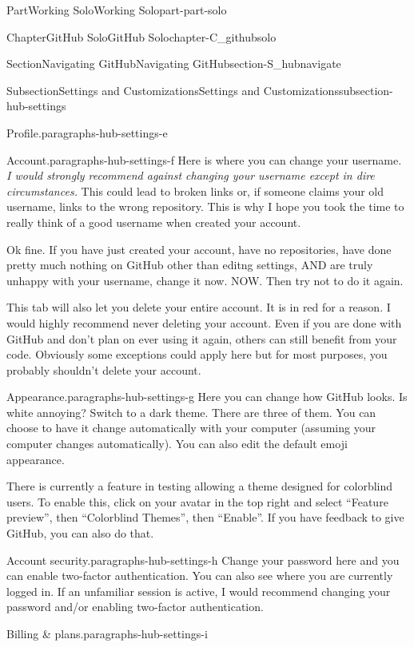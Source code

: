 \documentclass[oneside,10pt,]{book}
\begin{document}
\begin{partptx}{Part}{Working Solo}{}{Working Solo}{}{}{part-part-solo}
\begin{chapterptx}{Chapter}{GitHub Solo}{}{GitHub Solo}{}{}{chapter-C_githubsolo}
\begin{sectionptx}{Section}{Navigating GitHub}{}{Navigating GitHub}{}{}{section-S_hubnavigate}
\begin{subsectionptx}{Subsection}{Settings and Customizations}{}{Settings and Customizations}{}{}{subsection-hub-settings}
\begin{paragraphs}{Profile.}{paragraphs-hub-settings-e}
\end{paragraphs}%
\begin{paragraphs}{Account.}{paragraphs-hub-settings-f}%
%
Here is where you can change your username. \emph{I would strongly recommend against changing your username except in dire circumstances.} This could lead to broken links or, if someone claims your old username, links to the wrong repository. This is why I hope you took the time to really think of a good username when created your account.%
\par
Ok fine. If you have just created your account, have no repositories, have done pretty much nothing on GitHub other than editng settings, AND are truly unhappy with your username, change it now. NOW. Then try not to do it again.%
\par
This tab will also let you delete your entire account. It is in red for a reason. I would highly recommend never deleting your account. Even if you are done with GitHub and don't plan on ever using it again, others can still benefit from your code. Obviously some exceptions could apply here but for most purposes, you probably shouldn't delete your account.%
\end{paragraphs}%
\begin{paragraphs}{Appearance.}{paragraphs-hub-settings-g}%
%
Here you can change how GitHub looks. Is white annoying? Switch to a dark theme. There are three of them. You can choose to have it change automatically with your computer (assuming your computer changes automatically). You can also edit the default emoji appearance.%
\par
There is currently a feature in testing allowing a theme designed for colorblind users. To enable this, click on your avatar in the top right and select ``Feature preview'', then ``Colorblind Themes'', then ``Enable''. If you have feedback to give GitHub, you can also do that.%
\end{paragraphs}%
\begin{paragraphs}{Account security.}{paragraphs-hub-settings-h}%
%
Change your password here and you can enable two-factor authentication. You can also see where you are currently logged in. If an unfamiliar session is active, I would recommend changing your password and\slash{}or enabling two-factor authentication.%
\end{paragraphs}%
\begin{paragraphs}{Billing \& plans.}{paragraphs-hub-settings-i}%
%

\end{paragraphs}
\end{subsectionptx}
\end{sectionptx}
\end{chapterptx}
\end{partptx}
\end{document}
